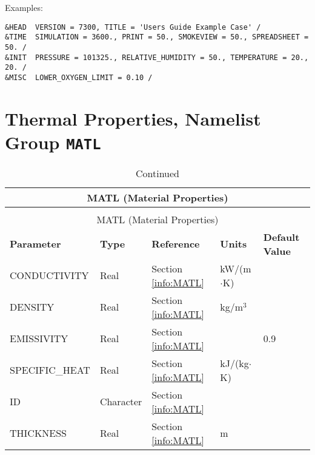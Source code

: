 \noindent Examples:
\begin{lstlisting}
&HEAD  VERSION = 7300, TITLE = 'Users Guide Example Case' /
&TIME  SIMULATION = 3600., PRINT = 50., SMOKEVIEW = 50., SPREADSHEET = 50. /
&INIT  PRESSURE = 101325., RELATIVE_HUMIDITY = 50., TEMPERATURE = 20., 20. /
&MISC  LOWER_OXYGEN_LIMIT = 0.10 /
\end{lstlisting}


\clearpage

\section{Thermal Properties, Namelist Group \texorpdfstring{{\tt MATL}}{MATL}}


\begin{longtable}{@{\extracolsep{\fill}}|l|l|l|l|l|}
\caption[Thermal Properties ({\ct MATL} namelist group)]{For more information see Section~\ref{info:MATL}.}
\label{tbl:MATL} \\
\hline
\multicolumn{5}{|c|}{{\ct MATL} (Material Properties)} \\
\hline \hline
\endfirsthead
\caption[]{Continued} \\
\hline
\multicolumn{5}{|c|}{{\ct MATL} (Material Properties)} \\
\hline \hline
\endhead
\parbox{1.5in}{\bf Parameter}    & \parbox{1in}{\bf Type}  & \parbox{1in}{\bf Reference}  & \parbox{1in}{\bf Units}  & \parbox{1in}{\bf Default Value} \\ \hline
{\ct CONDUCTIVITY}        & Real 	 & Section \ref{info:MATL}                 & kW/(m$\cdot$K)  &                 \\ \hline
{\ct DENSITY}             & Real 	 & Section \ref{info:MATL}                 & kg/m$^3$  &                 \\ \hline
{\ct EMISSIVITY}          & Real	 & Section \ref{info:MATL}                 &           &   0.9          \\ \hline
{\ct SPECIFIC\_HEAT}      & Real	 & Section \ref{info:MATL}                 & kJ/(kg$\cdot$K) &                 \\ \hline
{\ct ID}                  & Character    & Section \ref{info:MATL}                 &           &                 \\ \hline
{\ct THICKNESS}           & Real  	 & Section \ref{info:MATL}                 & m         &                 \\ \hline
\end{longtable}

